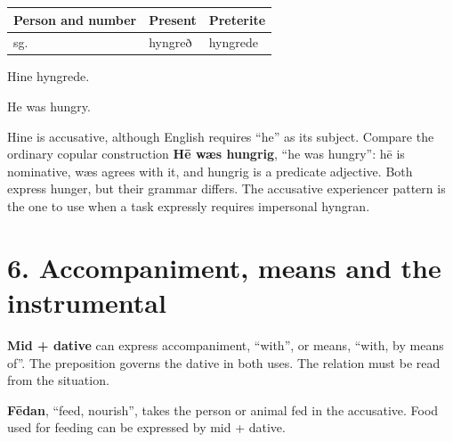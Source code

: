 \par\begingroup
\fontsize{10.5}{13.2}\selectfont
\setlength{\LTleft}{0pt}\setlength{\LTright}{\fill}
\noindent
\begin{tabular}{@{}>{\raggedright\arraybackslash}p{39.459mm}>{\raggedright\arraybackslash}p{39.459mm}>{\raggedright\arraybackslash}p{39.459mm}@{}}
\toprule
\textbf{Person and number} & \textbf{Present} & \textbf{Preterite} \\
\midrule
3 sg. & hyngreð & hyngrede \\
\bottomrule
\end{tabular}
\par\endgroup
Hine hyngrede.

He was hungry.

Hine is accusative, although English requires “he” as its subject. Compare the ordinary copular construction \textbf{Hē wæs hungrig}, “he was hungry”: hē is nominative, wæs agrees with it, and hungrig is a predicate adjective. Both express hunger, but their grammar differs. The accusative experiencer pattern is the one to use when a task expressly requires impersonal hyngran.

\section*{6. Accompaniment, means and the instrumental}

\textbf{Mid + dative} can express accompaniment, “with”, or means, “with, by means of”. The preposition governs the dative in both uses. The relation must be read from the situation.

\textbf{Fēdan}, “feed, nourish”, takes the person or animal fed in the accusative. Food used for feeding can be expressed by mid + dative.

